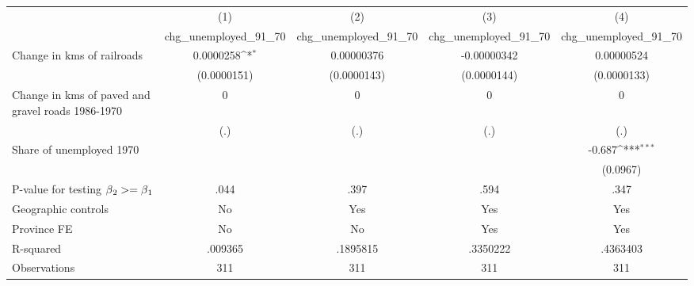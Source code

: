 {
\def\sym#1{\ifmmode^{#1}\else\(^{#1}\)\fi}
\begin{tabular}{l*{4}{c}}
\hline\hline
                &\multicolumn{1}{c}{(1)}&\multicolumn{1}{c}{(2)}&\multicolumn{1}{c}{(3)}&\multicolumn{1}{c}{(4)}\\
                &\multicolumn{1}{c}{chg\_unemployed\_91\_70}&\multicolumn{1}{c}{chg\_unemployed\_91\_70}&\multicolumn{1}{c}{chg\_unemployed\_91\_70}&\multicolumn{1}{c}{chg\_unemployed\_91\_70}\\
\hline
Change in kms of railroads&0.0000258\sym{*}  &0.00000376         &-0.00000342         &0.00000524         \\
                &(0.0000151)         &(0.0000143)         &(0.0000144)         &(0.0000133)         \\
[1em]
Change in kms of paved and gravel roads 1986-1970&        0         &        0         &        0         &        0         \\
                &      (.)         &      (.)         &      (.)         &      (.)         \\
[1em]
Share of unemployed 1970&                  &                  &                  &   -0.687\sym{***}\\
                &                  &                  &                  & (0.0967)         \\
\hline
P-value for testing $\beta\\_2 >= \beta\\_1$&     .044         &     .397         &     .594         &     .347         \\
Geographic controls&       No         &      Yes         &      Yes         &      Yes         \\
Province FE     &       No         &       No         &      Yes         &      Yes         \\
R-squared       &  .009365         & .1895815         & .3350222         & .4363403         \\
Observations    &      311         &      311         &      311         &      311         \\
\hline\hline
\end{tabular}
}
